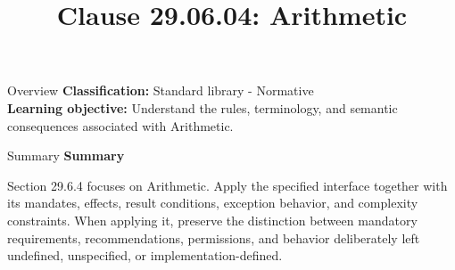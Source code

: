 \documentclass[10pt,letterpaper]{article}
\title{Clause 29.06.04: Arithmetic}
\author{}
\date{}
\begin{document}
\maketitle
\begin{CornellOverviewBox}{Overview}
\textbf{Classification:} Standard library - Normative\\[2pt]
\textbf{Learning objective:} Understand the rules, terminology, and semantic consequences associated with Arithmetic.
\end{CornellOverviewBox}\begin{CornellSummaryBox}{Summary}
{\sffamily\bfseries\color{Accent} Summary}\par\vspace{3pt}Section 29.6.4 focuses on Arithmetic. Apply the specified interface together with its mandates, effects, result conditions, exception behavior, and complexity constraints. When applying it, preserve the distinction between mandatory requirements, recommendations, permissions, and behavior deliberately left undefined, unspecified, or implementation-defined.
\end{CornellSummaryBox}
\end{document}
